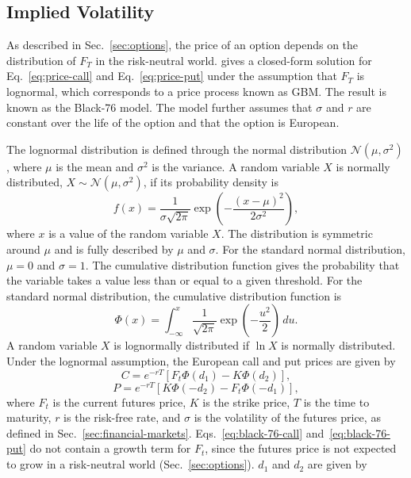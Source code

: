  \subsection{Implied Volatility}\label{sec:implied-vol}
As described in Sec.~\ref{sec:options}, the price of an option depends on the distribution of $F_T$ in the risk-neutral world. \textcite{blackPricingCommodityContracts1976} gives a closed-form solution for Eq.~\eqref{eq:price-call} and Eq.~\eqref{eq:price-put} under the assumption that $F_T$ is lognormal, which corresponds to a price process known as GBM. The result is known as the Black-76 model. The model further assumes that $\sigma$ and $r$ are constant over the life of the option and that the option is European.  

The lognormal distribution is defined through the normal distribution $\mathcal{N}(\mu, \sigma^2)$, where $\mu$ is the mean and $\sigma^2$ is the variance. A random variable $X$ is normally distributed, $X \sim \mathcal{N}(\mu, \sigma^2)$, if its probability density is
\begin{equation}
f(x) = \frac{1}{\sigma \sqrt{2\pi}}
       \exp\!\left(-\frac{(x-\mu)^2}{2\sigma^2}\right),
\end{equation}
where $x$ is a value of the random variable $X$. The distribution is symmetric around $\mu$ and is fully described by $\mu$ and $\sigma$. For the standard normal distribution, $\mu = 0$ and $\sigma = 1$. The cumulative distribution function gives the probability that the variable takes a value less than or equal to a given threshold. For the standard normal distribution, the cumulative distribution function is 
\begin{equation}
    \Phi(x) = \int_{-\infty}^{x} \frac{1}{\sqrt{2\pi}}
              \exp\!\left(-\frac{u^{2}}{2}\right) \, du.
    \label{eq:std-normal-cdf}
\end{equation}
A random variable $X$ is lognormally distributed if $\ln X$ is normally distributed. Under the lognormal assumption, the European call and put prices are given by
\begin{equation}
C = e^{-rT} \left[ F_t \Phi(d_1) - K \Phi(d_2) \right],
\label{eq:black-76-call}
\end{equation}
\begin{equation}
P = e^{-rT} \left[ K \Phi(-d_2) - F_t \Phi(-d_1) \right],
\label{eq:black-76-put}
\end{equation}
where $F_t$ is the current futures price, $K$ is the strike price, $T$ is the time to maturity, $r$ is the risk-free rate, and $\sigma$ is the volatility of the futures price, as defined in Sec.~\ref{sec:financial-markets}. Eqs.~\eqref{eq:black-76-call} and~\eqref{eq:black-76-put} do not contain a growth term for $F_t$, since the futures price is not expected to grow in a risk-neutral world (Sec.~\ref{sec:options}). $d_1$ and $d_2$ are given by
